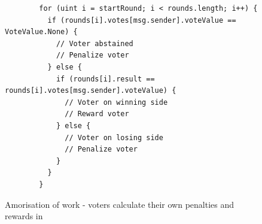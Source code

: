 \begin{figure}
  \begin{minipage}{\textwidth}
    \begin{framed}
      \begin{lstlisting}
        for (uint i = startRound; i < rounds.length; i++) {
          if (rounds[i].votes[msg.sender].voteValue == VoteValue.None) {
            // Voter abstained
            // Penalize voter
          } else {
            if (rounds[i].result == rounds[i].votes[msg.sender].voteValue) {
              // Voter on winning side
              // Reward voter
            } else {
              // Voter on losing side
              // Penalize voter
            }
          }
        }
      \end{lstlisting}
    \end{framed}
  \end{minipage}
  \caption{Amorisation of work - voters calculate their own penalties and
    rewards in }
\end{figure}

